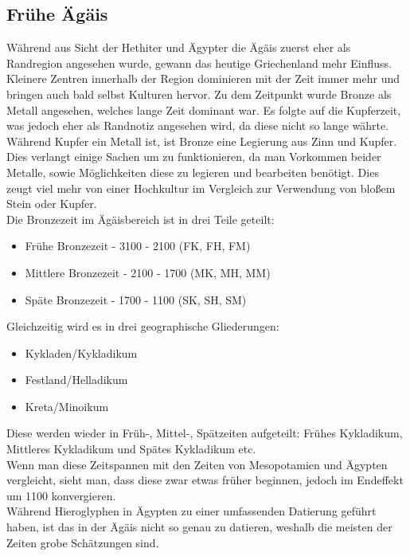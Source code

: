 \documentclass{article}
\begin{document}
	\subsection{Frühe Ägäis}
	Während aus Sicht der Hethiter und Ägypter die Ägäis zuerst eher als Randregion angesehen wurde, gewann das heutige Griechenland mehr Einfluss. Kleinere Zentren innerhalb der Region dominieren mit der Zeit immer mehr und bringen auch bald selbst Kulturen hervor. Zu dem Zeitpunkt wurde Bronze als Metall angesehen, welches lange Zeit dominant war. Es folgte auf die Kupferzeit, was jedoch eher als Randnotiz angesehen wird, da diese nicht so lange währte. Während Kupfer ein Metall ist, ist Bronze eine Legierung aus Zinn und Kupfer. Dies verlangt einige Sachen um zu funktionieren, da man Vorkommen beider Metalle, sowie Möglichkeiten diese zu legieren und bearbeiten benötigt. Dies zeugt viel mehr von einer Hochkultur im Vergleich zur Verwendung von bloßem Stein oder Kupfer. \\
	Die Bronzezeit im Ägäisbereich ist in drei Teile geteilt:
	\begin{itemize}
		\item{Frühe Bronzezeit - 3100 - 2100 (FK, FH, FM)}
		\item{Mittlere Bronzezeit - 2100 - 1700 (MK, MH, MM)}
		\item{Späte Bronzezeit - 1700 - 1100 (SK, SH, SM)}
	\end{itemize}
	Gleichzeitig wird es in drei geographische Gliederungen:
	\begin{itemize}
		\item{Kykladen/Kykladikum}
		\item{Festland/Helladikum}
		\item{Kreta/Minoikum}
	\end{itemize}
	Diese werden wieder in Früh-, Mittel-, Spätzeiten aufgeteilt: Frühes Kykladikum, Mittleres Kykladikum und Spätes Kykladikum etc. \\
	Wenn man diese Zeitspannen mit den Zeiten von Mesopotamien und Ägypten vergleicht, sieht man, dass diese zwar etwas früher beginnen, jedoch im Endeffekt um 1100 konvergieren. \\
	Während Hieroglyphen in Ägypten zu einer umfassenden Datierung geführt haben, ist das in der Ägäis nicht so genau zu datieren, weshalb die meisten der Zeiten grobe Schätzungen sind. \\ \\
	
\end{document}
